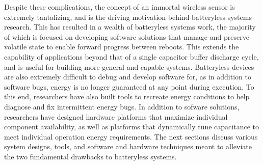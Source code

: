 Despite these complications, the concept of an immortal wireless sensor is extremely tantalizing, and is the driving motivation behind batteryless systems research.
This has resulted in a wealth of batteryless systems work, the majority of which is focused on developing software solutions that manage and preserve volatile state to enable forward progress between reboots.
This extends the capability of applications beyond that of a single capacitor buffer discharge cycle, and is useful for building more general and capable systems.
Batteryless devices are also extremely difficult to debug and develop software for, as in addition to software bugs, energy is no longer guaranteed at any point during execution.
To this end, researchers have also built tools to recreate energy conditions to help diagnose and fix intermittent energy bugs.
In addition to sofware solutions, researchers have designed hardware platforms that maximize individual component availability, as well as platforms that dynamically tune capacitance to meet individual operation energy requirements.
The next sections discuss various system designs, tools, and software and hardware techniques meant to alleviate the two fundamental drawbacks to batteryless systems.


